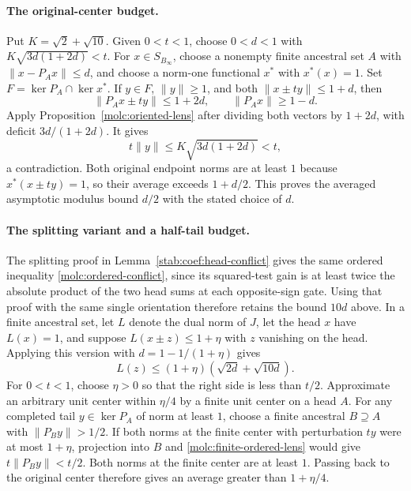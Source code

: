 \paragraph{The original-center budget.}\label{molc:original-center-budget}
Put $K=\sqrt2+\sqrt{10}$. Given $0<t<1$, choose $0<d<1$ with
$K\sqrt{3d(1+2d)}<t$. For $x\in S_{B_\infty}$, choose a nonempty finite
ancestral set $A$ with $\|x-P_Ax\|\le d$, and choose a norm-one functional
$x^*$ with $x^*(x)=1$. Set $F=\ker P_A\cap\ker x^*$.
If $y\in F$, $\|y\|\ge1$, and both $\|x\pm ty\|\le1+d$, then
\[
 \|P_Ax\pm ty\|\le1+2d,\qquad \|P_Ax\|\ge1-d.
\]
Apply Proposition~\ref{molc:oriented-lens} after dividing both vectors by
$1+2d$, with deficit $3d/(1+2d)$. It gives
\[
 t\|y\|\le K\sqrt{3d(1+2d)}<t,
\]
a contradiction. Both original endpoint norms are at least $1$ because
$x^*(x\pm ty)=1$, so their average exceeds $1+d/2$. This proves the
averaged asymptotic modulus bound $d/2$ with the stated choice of $d$.

\paragraph{The splitting variant and a half-tail budget.}\label{molc:half-tail-budget}
The splitting proof in Lemma~\ref{stab:coef:head-conflict} gives the
same ordered inequality \eqref{molc:ordered-conflict}, since its
squared-test gain is at least twice the absolute product of the two
head sums at each opposite-sign gate.
Using that proof with the same single orientation therefore retains
the bound $10d$ above.
In a finite ancestral set, let $L$ denote the dual norm of $J$, let the head
$x$ have $L(x)=1$, and suppose $L(x\pm z)\le1+\eta$ with $z$ vanishing on
the head. Applying this version with $d=1-1/(1+\eta)$ gives
\begin{equation}\label{molc:finite-ordered-lens}
 L(z)\le(1+\eta)(\sqrt{2d}+\sqrt{10d}).
\end{equation}
For $0<t<1$, choose $\eta>0$ so that the right side is less than $t/2$.
Approximate an arbitrary unit center within $\eta/4$ by a finite unit
center on a head $A$. For any completed tail $y\in\ker P_A$ of norm at
least $1$, choose a finite ancestral $B\supseteq A$ with
$\|P_By\|>1/2$. If both norms at the finite center with perturbation $ty$
were at most $1+\eta$, projection into $B$ and
\eqref{molc:finite-ordered-lens} would give $t\|P_By\|<t/2$.
Both norms at the finite center are at least $1$. Passing back to the
original center therefore gives an average greater than $1+\eta/4$.


